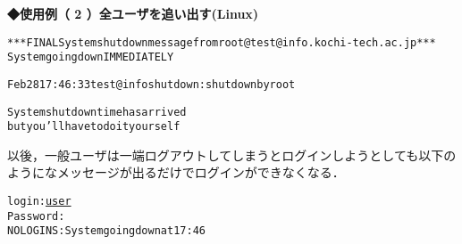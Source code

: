 {\bf ◆使用例（ 2 ）全ユーザを追い出す(Linux)}
\begin{center}
\begin{breakbox}
\begin{alltt}
 % \underline{shutdown -k now}  \keybox{Enter}
 *** FINAL System shutdown message from root@test@info.kochi-tech.ac.jp ***
 System going down IMMEDIATELY

 Feb 28 17:46:33 test@info shutdown:shutdown by root

 System shutdown time has arrived
 but you'll have to do it yourself  
 % 
\end{alltt}
\end{breakbox}
\end{center}

以後，一般ユーザは一端ログアウトしてしまうとログインしようとしても以下のようになメッセージが出るだけでログインができなくなる．\\
\begin{center}
\begin{breakbox}
\begin{alltt}
 login: \underline{user}  \\
 Password: \\


 NO LOGINS: System going down at 17:46\\
\end{alltt}
\end{breakbox}
\end{center}
\clearpage

